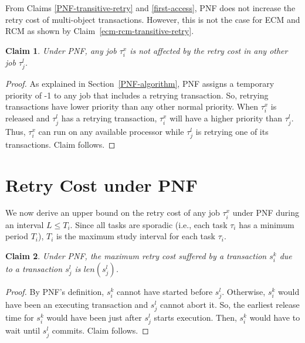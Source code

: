 \documentclass[a4paper,english]{article}
\newtheorem{clm}{Claim}
\newtheorem{proof}{Proof}
\begin{document}
From Claims \ref{PNF-transitive-retry} and \ref{first-access}, PNF does not increase the retry cost of multi-object transactions. However, this is not the case for ECM and RCM as shown by Claim~\ref{ecm-rcm-transitive-retry}. 

\begin{clm}\label{higher retry does not affect response}
Under PNF, any job $\tau_{i}^{x}$ is not affected by the retry cost in any other
job $\tau_{j}^{l}$.
\end{clm}
\begin{proof}\normalfont
As explained in Section~\ref{PNF-algorithm}, PNF assigns a temporary priority of -1 to any job that includes a retrying transaction. So, retrying transactions have lower priority than any other normal priority.
When $\tau_{i}^{x}$ is released and $\tau_j^l$ has a retrying transaction, $\tau_i^x$ will have a higher priority
than $\tau_j^l$. Thus, $\tau_i^x$ can run on any available processor while $\tau_j^l$ is retrying one of its transactions. Claim follows.
\end{proof}


\section{Retry Cost under PNF}\label{rc pnf sec}

We now derive an upper bound on the retry cost of any job $\tau_i^x$ under PNF during an interval $L\le T_i$. Since all tasks are sporadic (i.e., each task $\tau_i$ has a minimum period $T_i$), $T_i$ is the maximum study interval for each task $\tau_i$.

\begin{clm}\label{two transactions retry cost PNF}
Under PNF, the maximum retry cost suffered by a transaction $s_{i}^{k}$ due 
to a transaction $s_{j}^{l}$ is $len(s_{j}^{l})$.
\end{clm}
\begin{proof}\normalfont
By PNF's definition, $s_{i}^{k}$ cannot have started before
$s_{j}^{l}$. Otherwise, $s_i^k$ would have been an executing transaction and $s_{j}^{l}$ cannot abort it. So, the earliest release time for $s_{i}^{k}$ would have been just after $s_{j}^{l}$ starts execution. Then, $s_i^k$ would have to wait until $s_{j}^{l}$
commits. Claim follows.
\end{proof}
\end{document}
